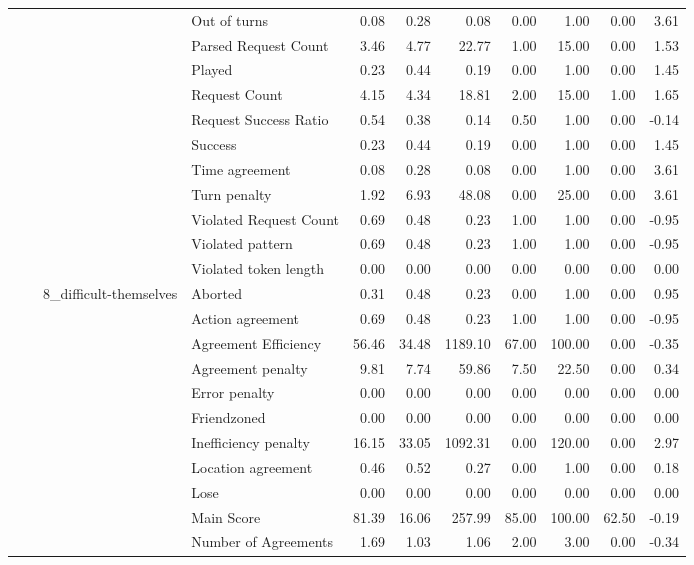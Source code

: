 \begin{tabular}{llllrrrrrrr}
 &  &  & Out of turns & 0.08 & 0.28 & 0.08 & 0.00 & 1.00 & 0.00 & 3.61 \\
 &  &  & Parsed Request Count & 3.46 & 4.77 & 22.77 & 1.00 & 15.00 & 0.00 & 1.53 \\
 &  &  & Played & 0.23 & 0.44 & 0.19 & 0.00 & 1.00 & 0.00 & 1.45 \\
 &  &  & Request Count & 4.15 & 4.34 & 18.81 & 2.00 & 15.00 & 1.00 & 1.65 \\
 &  &  & Request Success Ratio & 0.54 & 0.38 & 0.14 & 0.50 & 1.00 & 0.00 & -0.14 \\
 &  &  & Success & 0.23 & 0.44 & 0.19 & 0.00 & 1.00 & 0.00 & 1.45 \\
 &  &  & Time agreement & 0.08 & 0.28 & 0.08 & 0.00 & 1.00 & 0.00 & 3.61 \\
 &  &  & Turn penalty & 1.92 & 6.93 & 48.08 & 0.00 & 25.00 & 0.00 & 3.61 \\
 &  &  & Violated Request Count & 0.69 & 0.48 & 0.23 & 1.00 & 1.00 & 0.00 & -0.95 \\
 &  &  & Violated pattern & 0.69 & 0.48 & 0.23 & 1.00 & 1.00 & 0.00 & -0.95 \\
 &  &  & Violated token length & 0.00 & 0.00 & 0.00 & 0.00 & 0.00 & 0.00 & 0.00 \\
\cline{3-11}
 &  & \multirow[t]{27}{*}{8_difficult-themselves} & Aborted & 0.31 & 0.48 & 0.23 & 0.00 & 1.00 & 0.00 & 0.95 \\
 &  &  & Action agreement & 0.69 & 0.48 & 0.23 & 1.00 & 1.00 & 0.00 & -0.95 \\
 &  &  & Agreement Efficiency & 56.46 & 34.48 & 1189.10 & 67.00 & 100.00 & 0.00 & -0.35 \\
 &  &  & Agreement penalty & 9.81 & 7.74 & 59.86 & 7.50 & 22.50 & 0.00 & 0.34 \\
 &  &  & Error penalty & 0.00 & 0.00 & 0.00 & 0.00 & 0.00 & 0.00 & 0.00 \\
 &  &  & Friendzoned & 0.00 & 0.00 & 0.00 & 0.00 & 0.00 & 0.00 & 0.00 \\
 &  &  & Inefficiency penalty & 16.15 & 33.05 & 1092.31 & 0.00 & 120.00 & 0.00 & 2.97 \\
 &  &  & Location agreement & 0.46 & 0.52 & 0.27 & 0.00 & 1.00 & 0.00 & 0.18 \\
 &  &  & Lose & 0.00 & 0.00 & 0.00 & 0.00 & 0.00 & 0.00 & 0.00 \\
 &  &  & Main Score & 81.39 & 16.06 & 257.99 & 85.00 & 100.00 & 62.50 & -0.19 \\
 &  &  & Number of Agreements & 1.69 & 1.03 & 1.06 & 2.00 & 3.00 & 0.00 & -0.34 \\

\end{tabular}
